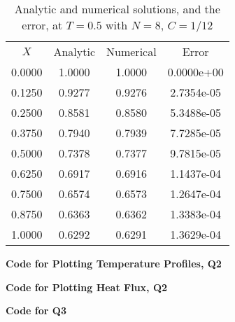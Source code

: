 \documentclass[12pt]{extarticle}
\begin{document}
\begin{table}[htp!]
\caption{Analytic and numerical solutions, and the error, at $T=0.5$ with $N=8$, $C=1/12$ }
\centering
\begin{tabular}{cccc}
\\
$X$ & Analytic & Numerical & Error \\ [0.5ex]
0.0000 & 1.0000 & 1.0000 & 0.0000e+00 \\ 
0.1250 & 0.9277 & 0.9276 & 2.7354e-05 \\ 
0.2500 & 0.8581 & 0.8580 & 5.3488e-05 \\ 
0.3750 & 0.7940 & 0.7939 & 7.7285e-05 \\ 
0.5000 & 0.7378 & 0.7377 & 9.7815e-05 \\ 
0.6250 & 0.6917 & 0.6916 & 1.1437e-04 \\ 
0.7500 & 0.6574 & 0.6573 & 1.2647e-04 \\ 
0.8750 & 0.6363 & 0.6362 & 1.3383e-04 \\ 
1.0000 & 0.6292 & 0.6291 & 1.3629e-04 \\ 
\end{tabular}
\label{table:9}
\end{table}


\pagebreak

\begin{center}
\textbf{Code for Plotting Temperature Profiles, Q2}
\end{center}


\begin{center}
\textbf{Code for Plotting Heat Flux, Q2}
\end{center}


\begin{center}
\textbf{Code for Q3}
\end{center}

\end{document}
